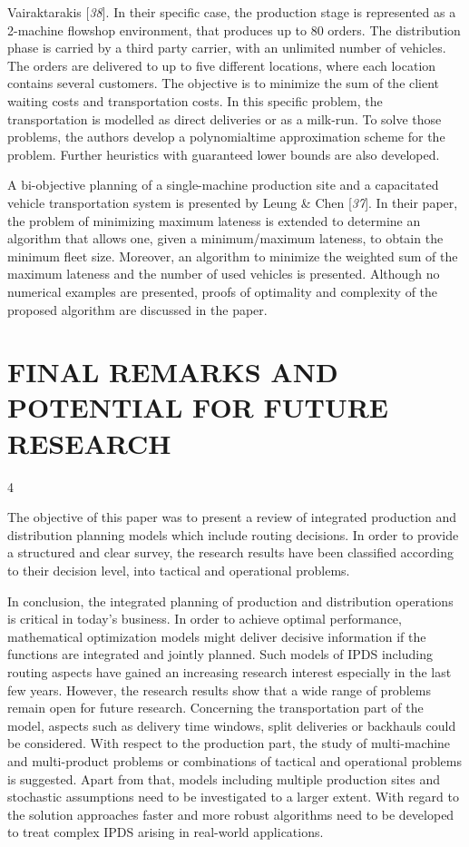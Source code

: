  Vairaktarakis [\textit{38}]. In their specific case,
 the production stage is represented as a 2-machine flowshop environment, that
 produces up to 80 orders. The distribution phase is carried by a third party carrier,
 with an unlimited number of vehicles. The orders are delivered to up to five
 different locations, where each location contains several customers. The objective is
 to minimize the sum of the client waiting costs and transportation costs. In this
 specific problem, the transportation is modelled as direct deliveries or as a
 milk-run. To solve those problems, the authors develop a polynomialtime approximation
 scheme for the problem. Further heuristics with guaranteed lower bounds are also
 developed.\par A bi-objective planning of a single-machine production site and a capacitated vehicle
 transportation system is presented by Leung \& Chen [\textit{37}]. In their paper, the problem of minimizing maximum lateness
 is extended to determine an algorithm that allows one, given a minimum/maximum
 lateness, to obtain the minimum fleet size. Moreover, an algorithm to minimize the
 weighted sum of the maximum lateness and the number of used vehicles is presented.
 Although no numerical examples are presented, proofs of optimality and complexity of
 the proposed algorithm are discussed in the paper.\section*{FINAL REMARKS AND POTENTIAL FOR FUTURE RESEARCH}4\par The objective of this paper was to present a review of integrated production and
 distribution planning models which include routing decisions. In order to provide a
 structured and clear survey, the research results have been classified according to
 their decision level, into tactical and operational problems.\par In conclusion, the integrated planning of production and distribution operations is
 critical in today's business. In order to achieve optimal performance, mathematical
 optimization models might deliver decisive information if the functions are integrated
 and jointly planned. Such models of IPDS including routing aspects have gained an
 increasing research interest especially in the last few years. However, the research
 results show that a wide range of problems remain open for future research. Concerning
 the transportation part of the model, aspects such as delivery time windows, split
 deliveries or backhauls could be considered. With respect to the production part, the
 study of multi-machine and multi-product problems or combinations of tactical and
 operational problems is suggested. Apart from that, models including multiple production
 sites and stochastic assumptions need to be investigated to a larger extent. With regard
 to the solution approaches faster and more robust algorithms need to be developed to
 treat complex IPDS arising in real-world applications.
